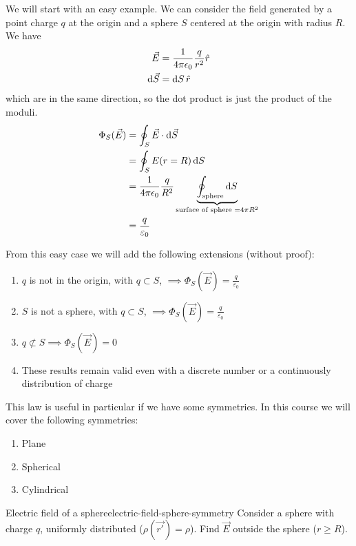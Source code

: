 \documentclass[12pt]{extarticle}
\begin{document}
We will start with an easy example.
We can consider the field generated by a point charge $q$ at the origin and a sphere $S$ centered at the origin with radius $R$.
We have
\begin{align}
    \vec E      & = \frac{1}{4 \pi \epsilon_0} \frac{q}{r^2} \hat r \\
    \dd{\vec S} & = \dd{S} \hat r
\end{align}
which are in the same direction, so the dot product is just the product of the moduli.
\begin{align}
    \Phi_S(\vec E) & = \oint_S \vec E \cdot \dd{\vec S}                                                                                         \\
                   & = \oint_S E(r = R) \dd{S}                                                                                                  \\
                   & = \frac{1}{4 \pi \epsilon_0} \frac{q}{R^2} \underbrace{\oint_\text{sphere} \dd{S}}_{\text{surface of sphere } = 4 \pi R^2} \\
                   & = \frac{q}{\varepsilon_0}
\end{align}

From this easy case we will add the following extensions (without proof):
\begin{enumerate}[label=\roman*.]
    \item $q$ is not in the origin, with $q \subset S$, $\implies \Phi_S(\vec E)=\frac{q}{\varepsilon_0}$
    \item $S$ is not a sphere, with $q \subset S$, $\implies \Phi_S(\vec E)=\frac{q}{\varepsilon_0}$
    \item $q \not \subset S \implies \Phi_S(\vec E)= 0$
    \item These results remain valid even with a discrete number or a continuously distribution of charge
\end{enumerate}

This law is useful in particular if we have some symmetries.
In this course we will cover the following symmetries:
\begin{enumerate}
    \item Plane
    \item Spherical
    \item Cylindrical
\end{enumerate}

\begin{example}{Electric field of a sphere}{electric-field-sphere-symmetry}
    Consider a sphere with charge $q$, uniformly distributed ($\rho(\vec{r'}) = \rho$).
    Find $\vec E$ outside the sphere ($r \geq R$).
\end{example}
\end{document}
